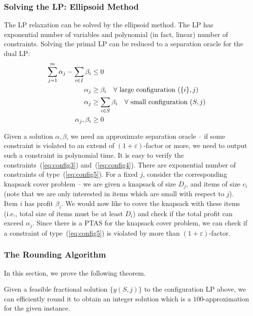 \subsubsection{Solving the LP: Ellipsoid Method}
The LP relaxation can be solved by the ellipsoid method. The LP has exponential number of variables and polynomial (in fact, linear) number of
constraints. Solving the primal LP  can be reduced to
a separation oracle for the dual LP:
\begin{align}
\label{eq:config3}
 \sum_{j=1}^m \alpha_j - \sum_{i \in I} \beta_i & \leq 0 \\
\label{eq:config4}
\alpha_j & \geq  \beta_i \ \ \ \forall \ {\mbox{large configuration $(\{i\}, j)$}} \\
\label{eq:config5}
\alpha_j & \geq  \sum_{i \in S} \beta_i \ \ \ \forall \ {\mbox{small configuration $(S, j)$}} \\
\notag
\alpha_j, \beta_i & \geq 0
\end{align}


Given a solution $\alpha, \beta$, we need an approximate separation oracle -- if some constraint is violated to an extend of $(1+\varepsilon)$-factor
or more, we need to output such a constraint in polynomial time. It is easy to verify the constraints~(\ref{eq:config3}) and~(\ref{eq:config4}). There
are exponential number of constraints of type~(\ref{eq:config5}). For a fixed $j$, consider the corresponding knapsack cover problem -- we are given
a knapsack of size $D_j$, and items of size $c_i$ (note that we are only interested in items which are small with respect to $j$). Item $i$ has
profit $\beta_i$. We would now like to cover the knapsack with these items (i.e., total size of items must be at least $D_i$) and check if the total
profit can exceed $\alpha_j$. Since there is a PTAS for the knapsack cover problem, we can check if a constraint of type~(\ref{eq:config5})
is violated by more than $(1+\varepsilon)$-factor.

\subsubsection{The Rounding Algorithm}

In this section, we prove the following theorem.
\begin{theorem} \label{thm:round-conf}
Given a feasible fractional solution $\{y(S,j)\}$ to the configuration LP above, we can efficiently round it to obtain an integer solution which is a $100$-approximation for the given \cckp instance.
\end{theorem}


